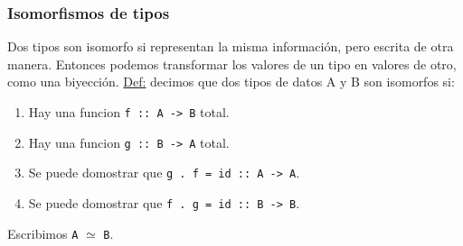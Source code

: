 \documentclass[12pt]{extarticle}
\def\definicion{\newline\underline{Def:} }
\newcommand\hsline[1]{\texttt{#1}}
\begin{document}
\subsubsection{Isomorfismos de tipos}
Dos tipos son isomorfo si representan la misma información, pero escrita de otra manera. Entonces podemos transformar los valores de un tipo en valores de otro, como una biyección.
\definicion decimos que dos tipos de datos A y B son isomorfos si:
\begin{enumerate}
\itemsep-0.35em 
\item Hay una funcion \hsline{f :: A -> B} total.
\item Hay una funcion \hsline{g :: B -> A} total.
\item Se puede domostrar que \hsline{g . f = id :: A -> A}.
\item Se puede domostrar que \hsline{f . g = id :: B -> B}.
\end{enumerate}
Escribimos \hsline{A} $\simeq$ \hsline{B}.




%
\end{document}
